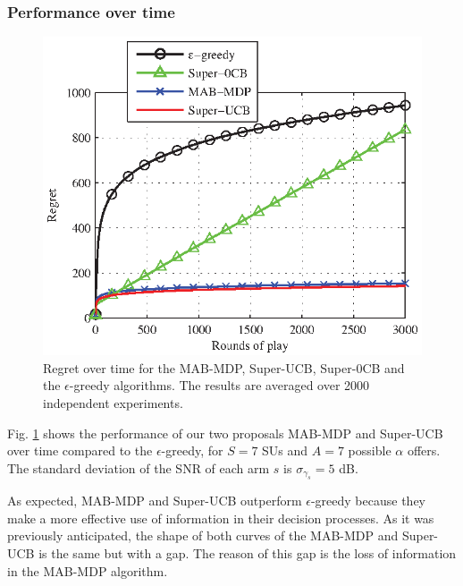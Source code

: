 \subsubsection{Performance over time}
\begin{figure}[!t]
\centering
\includegraphics{stoVsT.eps}
\caption{Regret over time for the MAB-MDP, Super-UCB, Super-0CB and the $\epsilon$-greedy algorithms. The results are averaged over 2000 independent experiments.}
\label{fig:stoVsT}
\end{figure}

Fig. \ref{fig:stoVsT} shows the performance of our two proposals MAB-MDP and Super-UCB over time compared to the $\epsilon$-greedy, for $S=7$ SUs and $A=7$ possible $\alpha$ offers.
The standard deviation of the SNR of each arm $s$ is $\sigma_{\gamma_s} = 5$ dB.

As expected, MAB-MDP and Super-UCB outperform $\epsilon$-greedy because they make a more effective use of information in their decision processes. As it was previously anticipated, the shape of both curves of the MAB-MDP and Super-UCB is the same but with a gap. The reason of this gap is the loss of information in the MAB-MDP algorithm.

